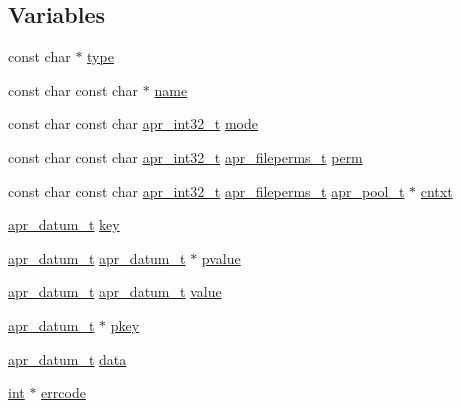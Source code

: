 \subsection*{Variables}
\begin{DoxyCompactItemize}
\item 
const char $\ast$ \hyperlink{group__APR__Util__DBM_ga763fd8db6bba8fbbbc113ca0d61c47c2}{type}
\item 
const char const char $\ast$ \hyperlink{group__APR__Util__DBM_ga8f8f80d37794cde9472343e4487ba3eb}{name}
\item 
const char const char \hyperlink{group__apr__platform_ga21ef1e35fd3ff9be386f3cb20164ff02}{apr\+\_\+int32\+\_\+t} \hyperlink{group__APR__Util__DBM_ga719919dff9b073c668fd47f22f420774}{mode}
\item 
const char const char \hyperlink{group__apr__platform_ga21ef1e35fd3ff9be386f3cb20164ff02}{apr\+\_\+int32\+\_\+t} \hyperlink{group__apr__file__info_ga3af19c4c47007169064a70f9351bc7d8}{apr\+\_\+fileperms\+\_\+t} \hyperlink{group__APR__Util__DBM_gaa8065a83f4f6501dc243d0c894030278}{perm}
\item 
const char const char \hyperlink{group__apr__platform_ga21ef1e35fd3ff9be386f3cb20164ff02}{apr\+\_\+int32\+\_\+t} \hyperlink{group__apr__file__info_ga3af19c4c47007169064a70f9351bc7d8}{apr\+\_\+fileperms\+\_\+t} \hyperlink{structapr__pool__t}{apr\+\_\+pool\+\_\+t} $\ast$ \hyperlink{group__APR__Util__DBM_gaccfefcf49a583f9ce90eac758615a78f}{cntxt}
\item 
\hyperlink{structapr__datum__t}{apr\+\_\+datum\+\_\+t} \hyperlink{group__APR__Util__DBM_gab55cc60daf96249ee901ce579a588fe7}{key}
\item 
\hyperlink{structapr__datum__t}{apr\+\_\+datum\+\_\+t} \hyperlink{structapr__datum__t}{apr\+\_\+datum\+\_\+t} $\ast$ \hyperlink{group__APR__Util__DBM_ga28a8123792275d5480b92912a9e85b0e}{pvalue}
\item 
\hyperlink{structapr__datum__t}{apr\+\_\+datum\+\_\+t} \hyperlink{structapr__datum__t}{apr\+\_\+datum\+\_\+t} \hyperlink{group__APR__Util__DBM_gadc340d19528d957d4c7e16bc8bc70b2d}{value}
\item 
\hyperlink{structapr__datum__t}{apr\+\_\+datum\+\_\+t} $\ast$ \hyperlink{group__APR__Util__DBM_ga1bbfe97dd2f6cc19a02af7fd6ef61fbd}{pkey}
\item 
\hyperlink{structapr__datum__t}{apr\+\_\+datum\+\_\+t} \hyperlink{group__APR__Util__DBM_ga4ff6b2b1fb4c551508be94e8b31d75c7}{data}
\item 
\hyperlink{pcre_8txt_a42dfa4ff673c82d8efe7144098fbc198}{int} $\ast$ \hyperlink{group__APR__Util__DBM_ga01afc7eb5f3439433db4e8fdbed092e9}{errcode}

\end{DoxyCompactItemize}
